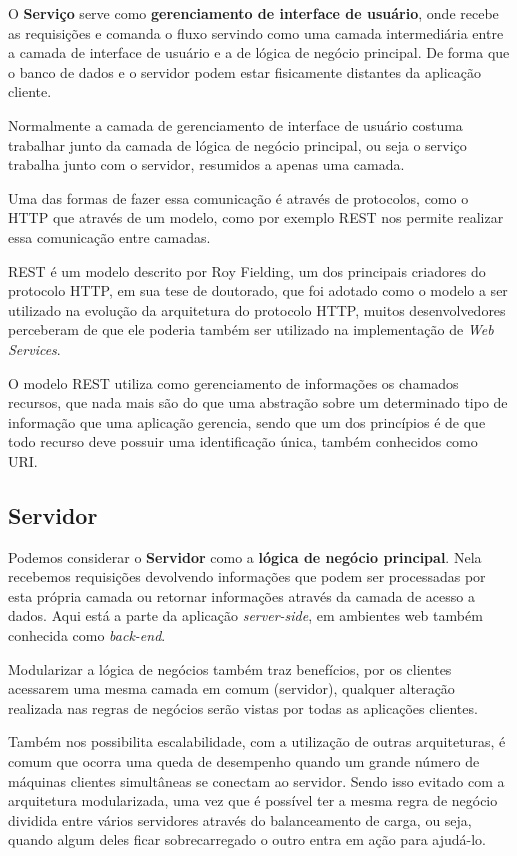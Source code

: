 \documentclass[
	12pt,				%
	openright,			%
	twoside,			%
	a4paper,			%
	english,			%
	brazil				%
	]{abntex2}
\begin{document}
O \textbf{Serviço} serve como \textbf{gerenciamento de interface de usuário}, onde recebe as requisições e comanda o fluxo servindo como uma camada intermediária entre a camada de interface de usuário e a de lógica de negócio principal. De forma que o banco de dados e o servidor podem estar fisicamente distantes da aplicação cliente.

Normalmente a camada de gerenciamento de interface de usuário costuma trabalhar junto da camada de lógica de negócio principal, ou seja o serviço trabalha junto com o servidor, resumidos a apenas uma camada.

Uma das formas de fazer essa comunicação é através de protocolos, como o HTTP que através de um modelo, como por exemplo REST nos permite realizar essa comunicação entre camadas.

REST é um modelo descrito por Roy Fielding, um dos principais criadores do protocolo HTTP, em sua tese de doutorado, que foi adotado como o modelo a ser utilizado na evolução da arquitetura do protocolo HTTP, muitos desenvolvedores perceberam de que ele poderia também ser utilizado na implementação de \textit{Web Services}.

O modelo REST utiliza como gerenciamento de informações os chamados recursos, que nada mais são do que uma abstração sobre um determinado tipo de informação que uma aplicação gerencia, sendo que um dos princípios é de que todo recurso deve possuir uma identificação única, também conhecidos como URI.

\subsection{Servidor}
\label{subsec:Servidor}

Podemos considerar o \textbf{Servidor} como a \textbf{lógica de negócio principal}. Nela recebemos requisições devolvendo informações que podem ser processadas por esta própria camada ou retornar informações através da camada de acesso a dados. Aqui está a parte da aplicação \textit{server-side}, em ambientes web também conhecida como \textit{back-end}.

Modularizar a lógica de negócios também traz benefícios, por os clientes acessarem uma mesma camada em comum (servidor), qualquer alteração realizada nas regras de negócios serão vistas por todas as aplicações clientes.

Também nos possibilita escalabilidade, com a utilização de outras arquiteturas, é comum que ocorra uma queda de desempenho quando um grande número de máquinas clientes simultâneas se conectam ao servidor. Sendo isso evitado com a arquitetura modularizada, uma vez que é possível ter a mesma regra de negócio dividida entre vários servidores através do balanceamento de carga, ou seja, quando algum deles ficar sobrecarregado o outro entra em ação para ajudá-lo. 
\end{document}
